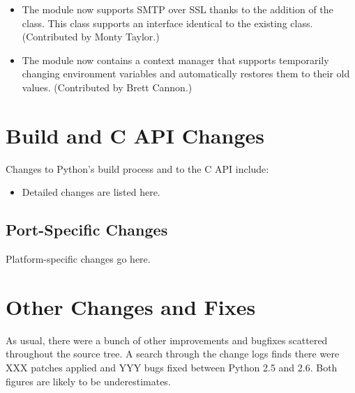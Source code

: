 \documentclass{howto}
\begin{document}
\begin{itemize}
\item The  module now supports SMTP over 
SSL thanks to the addition of the  class.
This class supports an interface identical to the existing  
class. (Contributed by Monty Taylor.)

\item The  module now contains a
 context manager that 
supports temporarily changing environment variables and 
automatically restores them to their old values.
(Contributed by Brett Cannon.)

\end{itemize}




\section{Build and C API Changes}

Changes to Python's build process and to the C API include:

\begin{itemize}

\item Detailed changes are listed here.

\end{itemize}


\subsection{Port-Specific Changes}

Platform-specific changes go here.


\section{Other Changes and Fixes \label{section-other}}

As usual, there were a bunch of other improvements and bugfixes
scattered throughout the source tree.  A search through the change
logs finds there were XXX patches applied and YYY bugs fixed between
Python 2.5 and 2.6.  Both figures are likely to be underestimates.
\end{document}
